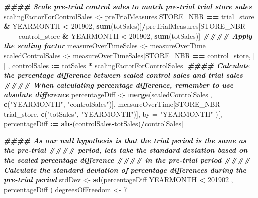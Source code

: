\documentclass[
]{article}
\newenvironment{Shaded}{\begin{snugshade}}{\end{snugshade}}
\newcommand{\AttributeTok}[1]{\textcolor[rgb]{0.13,0.29,0.53}{#1}}
\newcommand{\DecValTok}[1]{\textcolor[rgb]{0.00,0.00,0.81}{#1}}
\newcommand{\DocumentationTok}[1]{\textcolor[rgb]{0.56,0.35,0.01}{\textbf{\textit{#1}}}}
\newcommand{\FunctionTok}[1]{\textcolor[rgb]{0.13,0.29,0.53}{\textbf{#1}}}
\newcommand{\NormalTok}[1]{#1}
\newcommand{\OtherTok}[1]{\textcolor[rgb]{0.56,0.35,0.01}{#1}}
\newcommand{\SpecialCharTok}[1]{\textcolor[rgb]{0.81,0.36,0.00}{\textbf{#1}}}
\newcommand{\StringTok}[1]{\textcolor[rgb]{0.31,0.60,0.02}{#1}}
\begin{document}
\begin{Shaded}
\begin{Highlighting}[]
\DocumentationTok{\#\#\#\# Scale pre{-}trial control sales to match pre{-}trial trial store sales}
\NormalTok{scalingFactorForControlSales }\OtherTok{\textless{}{-}}\NormalTok{ preTrialMeasures[STORE\_NBR }\SpecialCharTok{==}\NormalTok{ trial\_store }\SpecialCharTok{\&}
\NormalTok{YEARMONTH }\SpecialCharTok{\textless{}} \DecValTok{201902}\NormalTok{, }\FunctionTok{sum}\NormalTok{(totSales)]}\SpecialCharTok{/}\NormalTok{preTrialMeasures[STORE\_NBR }\SpecialCharTok{==}\NormalTok{ control\_store }\SpecialCharTok{\&}
\NormalTok{YEARMONTH }\SpecialCharTok{\textless{}} \DecValTok{201902}\NormalTok{, }\FunctionTok{sum}\NormalTok{(totSales)]}
\DocumentationTok{\#\#\#\# Apply the scaling factor}
\NormalTok{measureOverTimeSales }\OtherTok{\textless{}{-}}\NormalTok{ measureOverTime}
\NormalTok{scaledControlSales }\OtherTok{\textless{}{-}}\NormalTok{ measureOverTimeSales[STORE\_NBR }\SpecialCharTok{==}\NormalTok{ control\_store, ][ ,}
\NormalTok{controlSales }\SpecialCharTok{:=}\NormalTok{ totSales }\SpecialCharTok{*}\NormalTok{ scalingFactorForControlSales]}
\DocumentationTok{\#\#\#\# Calculate the percentage difference between scaled control sales and trial sales}
\DocumentationTok{\#\#\#\# When calculating percentage difference, remember to use absolute difference}
\NormalTok{percentageDiff }\OtherTok{\textless{}{-}} \FunctionTok{merge}\NormalTok{(scaledControlSales[, }\FunctionTok{c}\NormalTok{(}\StringTok{"YEARMONTH"}\NormalTok{, }\StringTok{"controlSales"}\NormalTok{)],}
\NormalTok{measureOverTime[STORE\_NBR }\SpecialCharTok{==}\NormalTok{ trial\_store, }\FunctionTok{c}\NormalTok{(}\StringTok{"totSales"}\NormalTok{, }\StringTok{"YEARMONTH"}\NormalTok{)],}
\AttributeTok{by =} \StringTok{"YEARMONTH"}
\NormalTok{)[, percentageDiff }\SpecialCharTok{:=} \FunctionTok{abs}\NormalTok{(controlSales}\SpecialCharTok{{-}}\NormalTok{totSales)}\SpecialCharTok{/}\NormalTok{controlSales]}

\DocumentationTok{\#\#\#\# As our null hypothesis is that the trial period is the same as the pre{-}trial}
\DocumentationTok{\#\#\#\# period, let\textquotesingle{}s take the standard deviation based on the scaled percentage difference}
\DocumentationTok{\#\#\#\# in the pre{-}trial period}
\DocumentationTok{\#\#\#\# Calculate the standard deviation of percentage differences during the pre{-}trial period}
\NormalTok{stdDev }\OtherTok{\textless{}{-}} \FunctionTok{sd}\NormalTok{(percentageDiff[YEARMONTH }\SpecialCharTok{\textless{}} \DecValTok{201902}\NormalTok{ , percentageDiff])}
\NormalTok{degreesOfFreedom }\OtherTok{\textless{}{-}} \DecValTok{7}


\end{Highlighting}
\end{Shaded}
\end{document}
